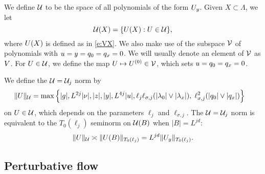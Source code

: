 We define $\mathcal{U}$ to be the space of all polynomials of the form $U_y$.
Given $X \subset \Lambda$, we let
\begin{equation}
\label{e:Vcalesig}
\mathcal{U}(X) = \{U(X) : U \in \mathcal{U} \},
\end{equation}
where $U(X)$ is defined as in \eqref{e:VX}.
We also make use of the %
subspace $\mathcal{V}$ of polynomials with
$u = y = q_0=q_x = 0$.
We will usually denote an element of $\mathcal{V}$ as $V$.
For $U \in \mathcal{U}$, we define %
the map $U \mapsto U^{(0)} \in \mathcal{V}$, which sets
$u = q_0 = q_x = 0$.

We define the $\mathcal{U} = \mathcal{U}_j$ norm by
\begin{equation}
\label{e:Vnormdef}
\begin{aligned}
\|U\|_{\mathcal{U}} &=
\max\Big\{
|g|, L^{2j}|\nu|, |z|, |y|,  L^{4j}|u|,
\ell_j\ell_{\sigma,j}(|\lambda_0|\vee|\lambda_x|),\;
 \ell_{\sigma,j}^{2} (|q_0|\vee|q_x|)
\Big\}
\end{aligned}
\end{equation}
on $U \in \mathcal{U}$, which depends on the parameters $\ell_j$ and $\ell_{\sigma,j}$.
The $\mathcal{U} = \mathcal{U}_j$ norm is equivalent to the $T_0(\ell_j)$ seminorm on $\mathcal{U}(B)$
when $|B| = L^{jd}$:
\begin{equation}
\|U\|_{\mathcal{U}} \asymp \|U(B)\|_{T_0(\ell_j)} = L^{jd} \|U_y\|_{T_0(\ell_j)}.
\end{equation}


\subsection{Perturbative flow}
\label{sec:pt}

